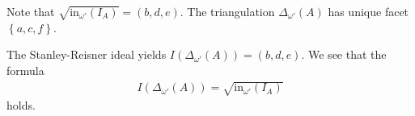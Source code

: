 \documentclass[a4paper, 11pt]{article}
\begin{document}
\begin{eg}
  Note that \( \sqrt{\mathrm{in}_{\omega'}(I_A)} = (b,d,e) \). The triangulation \( \Delta_{\omega'}(A) \) has unique facet \( \left\{ a,c,f \right\} \). 
  \begin{figure}[H]
    \centering
  \end{figure}
  
  The Stanley-Reisner ideal yields \( I(\Delta_{\omega'}(A)) = (b,d,e) \). We see that the formula 
  \begin{align*}
    I(\Delta_{\omega'}(A)) = \sqrt{\mathrm{in}_{\omega'}(I_A)} 
  \end{align*}
  holds.
  
\end{eg}
\end{document}

